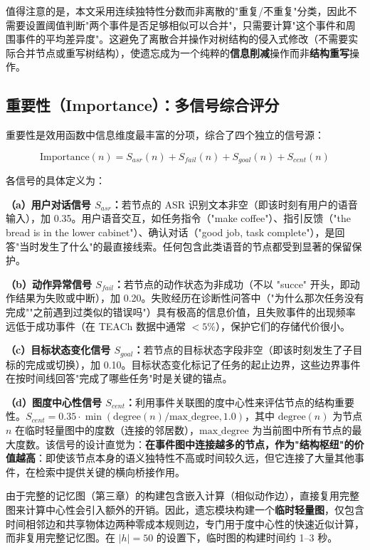 值得注意的是，本文采用连续独特性分数而非离散的"重复/不重复"分类，因此不需要设置阈值判断"两个事件是否足够相似可以合并"，只需要计算"这个事件和周围事件的平均差异度"。这避免了离散合并操作对树结构的侵入式修改（不需要实际合并节点或重写树结构），使遗忘成为一个纯粹的\textbf{信息削减}操作而非\textbf{结构重写}操作。

\subsection{重要性（Importance）：多信号综合评分}

重要性是效用函数中信息维度最丰富的分项，综合了四个独立的信号源：

\begin{equation}
\text{Importance}(n) = S_{asr}(n) + S_{fail}(n) + S_{goal}(n) + S_{cent}(n)
\label{eq:4-6}
\end{equation}

各信号的具体定义为：

\textbf{（a）用户对话信号 $S_{asr}$：}若节点的 ASR 识别文本非空（即该时刻有用户的语音输入），加 0.35。用户语音交互，如任务指令（"make coffee"）、指引反馈（"the bread is in the lower cabinet"）、确认对话（"good job, task complete"），是回答"当时发生了什么"的最直接线索。任何包含此类语音的节点都受到显著的保留保护。

\textbf{（b）动作异常信号 $S_{fail}$：}若节点的动作状态为非成功（不以 "succe" 开头，即动作结果为失败或中断），加 0.20。失败经历在诊断性问答中（"为什么那次任务没有完成""之前遇到过类似的错误吗"）具有极高的信息价值，且失败事件的出现频率远低于成功事件（在 TEACh 数据中通常 $< 5\%$），保护它们的存储代价很小。

\textbf{（c）目标状态变化信号 $S_{goal}$：}若节点的目标状态字段非空（即该时刻发生了子目标的完成或切换），加 0.10。目标状态变化标记了任务的起止边界，这些边界事件在按时间线回答"完成了哪些任务"时是关键的锚点。

\textbf{（d）图度中心性信号 $S_{cent}$：}利用事件关联图的度中心性来评估节点的结构重要性。$S_{cent} = 0.35 \cdot \min(\mathrm{degree}(n) / \mathrm{max\_degree}, 1.0)$，其中 $\mathrm{degree}(n)$ 为节点 $n$ 在临时轻量图中的度数（连接的邻居数），$\mathrm{max\_degree}$ 为当前图中所有节点的最大度数。该信号的设计直觉为：\textbf{在事件图中连接越多的节点，作为"结构枢纽"的价值越高}：即使该节点本身的语义独特性不高或时间较久远，但它连接了大量其他事件，在检索中提供关键的横向桥接作用。

由于完整的记忆图（第三章）的构建包含嵌入计算（相似动作边），直接复用完整图来计算中心性会引入额外的开销。因此，遗忘模块构建一个\textbf{临时轻量图}，仅包含时间相邻边和共享物体边两种零成本规则边，专门用于度中心性的快速近似计算，而非复用完整记忆图。在 $|h|=50$ 的设置下，临时图的构建时间约 1–3 秒。

